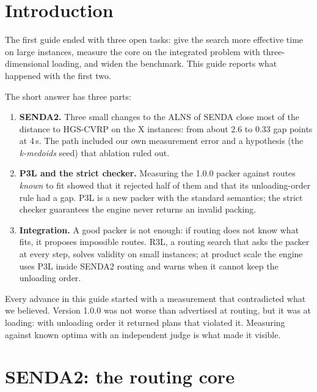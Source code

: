\documentclass[11pt,a4paper]{article}
\newcommand{\senda}{SENDA}
\newcommand{\sendados}{SENDA2}
\begin{document}
\section{Introduction}
\label{sec:intro}

The first guide ended with three open tasks: give the search more effective time on large instances,
measure the core on the integrated problem with three-dimensional loading, and widen the benchmark.
This guide reports what happened with the first two.

The short answer has three parts:

\begin{enumerate}[leftmargin=1.5em]
\item \textbf{\sendados.} Three small changes to the ALNS of \senda{} close most of the distance to
HGS-CVRP on the X instances: from about 2.6 to 0.33 gap points at 4\,s. The path included our own
measurement error and a hypothesis (the \emph{k-medoids} seed) that ablation ruled out.
\item \textbf{P3L and the strict checker.} Measuring the 1.0.0 packer against routes \emph{known} to
fit showed that it rejected half of them and that its unloading-order rule had a gap. P3L is a new
packer with the standard semantics; the strict checker guarantees the engine never returns an invalid
packing.
\item \textbf{Integration.} A good packer is not enough: if routing does not know what fits, it
proposes impossible routes. R3L, a routing search that asks the packer at every step, solves validity
on small instances; at product scale the engine uses P3L inside \sendados{} routing and warns when it
cannot keep the unloading order.
\end{enumerate}

\begin{ideaclave}
Every advance in this guide started with a measurement that contradicted what we believed. Version
1.0.0 was not worse than advertised at routing, but it was at loading: with unloading order it returned
plans that violated it. Measuring against known optima with an independent judge is what made it
visible.
\end{ideaclave}

\section{\sendados: the routing core}
\label{sec:sendados}
\end{document}
